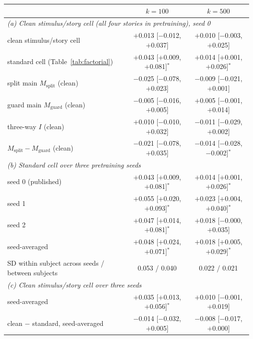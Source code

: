 \begin{tabular}{lcc}
\toprule
 & $k{=}100$ & $k{=}500$ \\
\midrule
\multicolumn{3}{l}{\emph{(a) Clean stimulus/story cell (all four stories in pretraining), seed 0}}\\
clean stimulus/story cell & $+$0.013 {\scriptsize[$-$0.012, $+$0.037]} & $+$0.010 {\scriptsize[$-$0.003, $+$0.025]} \\
standard cell (Table~\ref{tab:factorial}) & $+$0.043 {\scriptsize[$+$0.009, $+$0.081]}$^{*}$ & $+$0.014 {\scriptsize[$+$0.001, $+$0.026]}$^{*}$ \\
\quad split main $M_{\mathrm{split}}$ (clean) & $-$0.025 {\scriptsize[$-$0.078, $+$0.023]} & $-$0.009 {\scriptsize[$-$0.021, $+$0.001]} \\
\quad guard main $M_{\mathrm{guard}}$ (clean) & $-$0.005 {\scriptsize[$-$0.016, $+$0.005]} & $+$0.005 {\scriptsize[$-$0.001, $+$0.014]} \\
\quad three-way $I$ (clean) & $+$0.010 {\scriptsize[$-$0.010, $+$0.032]} & $-$0.011 {\scriptsize[$-$0.029, $+$0.002]} \\
\quad $M_{\mathrm{split}}-M_{\mathrm{guard}}$ (clean) & $-$0.021 {\scriptsize[$-$0.078, $+$0.035]} & $-$0.014 {\scriptsize[$-$0.028, $-$0.002]}$^{*}$ \\
\midrule\multicolumn{3}{l}{\emph{(b) Standard cell over three pretraining seeds}}\\
seed 0 (published) & $+$0.043 {\scriptsize[$+$0.009, $+$0.081]}$^{*}$ & $+$0.014 {\scriptsize[$+$0.001, $+$0.026]}$^{*}$ \\
seed 1 & $+$0.055 {\scriptsize[$+$0.020, $+$0.093]}$^{*}$ & $+$0.023 {\scriptsize[$+$0.004, $+$0.040]}$^{*}$ \\
seed 2 & $+$0.047 {\scriptsize[$+$0.014, $+$0.081]}$^{*}$ & $+$0.018 {\scriptsize[$-$0.000, $+$0.035]} \\
seed-averaged & $+$0.048 {\scriptsize[$+$0.024, $+$0.071]}$^{*}$ & $+$0.018 {\scriptsize[$+$0.005, $+$0.029]}$^{*}$ \\
SD within subject across seeds / between subjects & 0.053 / 0.040 & 0.022 / 0.021 \\
\midrule\multicolumn{3}{l}{\emph{(c) Clean stimulus/story cell over three seeds}}\\
seed-averaged & $+$0.035 {\scriptsize[$+$0.013, $+$0.056]}$^{*}$ & $+$0.010 {\scriptsize[$-$0.001, $+$0.019]} \\
clean $-$ standard, seed-averaged & $-$0.014 {\scriptsize[$-$0.032, $+$0.005]} & $-$0.008 {\scriptsize[$-$0.017, $+$0.000]} \\

\end{tabular}
